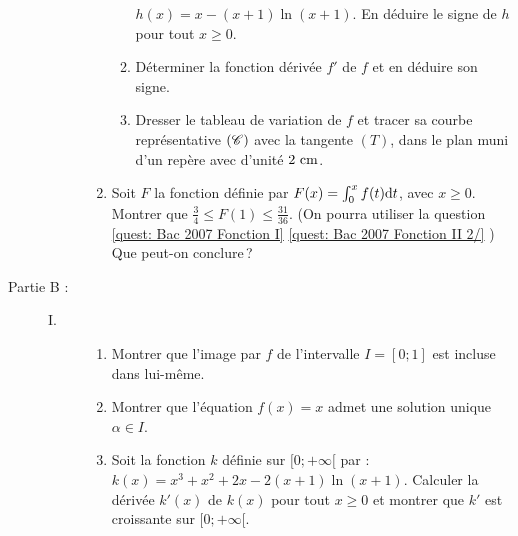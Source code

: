 \begin{description}
\begin{description}
\begin{enumerate}
\begin{enumerate}
                                                      $h(x) = x - (x+1) \ln (x+1)$.
                                                      En d\'eduire le signe de $h$ pour tout $x \geq 0$.
                                                \item D\'eterminer la fonction d\'eriv\'ee $f'$ de $f$ et en d\'eduire son signe.
                                                \item Dresser le tableau de variation de $f$ et tracer sa courbe
                                                      repr\'esentative $\Courbe$ avec la tangente $(T)$, dans le plan 
                                                      muni d'un rep\`ere \Oij{} avec d'unit\'e $2\cm$.
                                          \end{enumerate}
                                    \item Soit $F$ la fonction d\'efinie par
                                          $F(x) = \int_{0}^{x} f(t) \mathrm{d}t$, avec $x \geq 0$.
                                          Montrer que $\frac{3}{4} \leq F(1) \leq \frac{31}{36}$.
                                          (On pourra utiliser la question 
                                          \ref{quest: Bac 2007 Fonction I} \ref{quest: Bac 2007 Fonction II 2/}%
                                          )
                                          Que peut-on conclure\,?
                              \end{enumerate}
                  \end{description}
            \item[Partie B :]
                  \begin{description}
                        \item[I. ]
                              \begin{enumerate}
                                    \item Montrer que l'image par $f$ de l'intervalle $I = [0;1]$ est incluse dans lui-m\^eme.
                                    \item Montrer que l'\'equation $f(x) = x$ admet une solution unique $\alpha \in I$.
                                    \item Soit la fonction $k$ d\'efinie sur $[0;+\infty[$ par : 
                                          $k(x) = x^3 + x^2 + 2x - 2 (x+1) \ln (x+1)$.
                                          Calculer la d\'eriv\'ee $k'(x)$ de $k(x)$ pour tout $x \geq 0$ et montrer que 
                                          $k'$ est croissante sur $[0;+\infty[$.

\end{enumerate}
\end{description}
\end{description}
